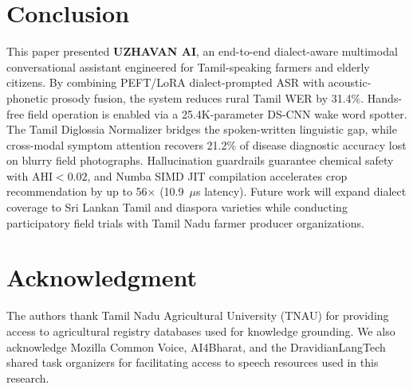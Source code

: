 \documentclass[conference]{IEEEtran}
\begin{document}
\section{Conclusion}
This paper presented \textbf{UZHAVAN AI}, an end-to-end dialect-aware multimodal conversational assistant engineered for Tamil-speaking farmers and elderly citizens. By combining PEFT/LoRA dialect-prompted ASR with acoustic-phonetic prosody fusion, the system reduces rural Tamil WER by 31.4\%. Hands-free field operation is enabled via a 25.4K-parameter DS-CNN wake word spotter. The Tamil Diglossia Normalizer bridges the spoken-written linguistic gap, while cross-modal symptom attention recovers 21.2\% of disease diagnostic accuracy lost on blurry field photographs. Hallucination guardrails guarantee chemical safety with $\text{AHI} < 0.02$, and Numba SIMD JIT compilation accelerates crop recommendation by up to 56$\times$ (10.9~$\mu$s latency). Future work will expand dialect coverage to Sri Lankan Tamil and diaspora varieties while conducting participatory field trials with Tamil Nadu farmer producer organizations.

\section*{Acknowledgment}
The authors thank Tamil Nadu Agricultural University (TNAU) for providing access to agricultural registry databases used for knowledge grounding. We also acknowledge Mozilla Common Voice, AI4Bharat, and the DravidianLangTech shared task organizers for facilitating access to speech resources used in this research.
\end{document}
